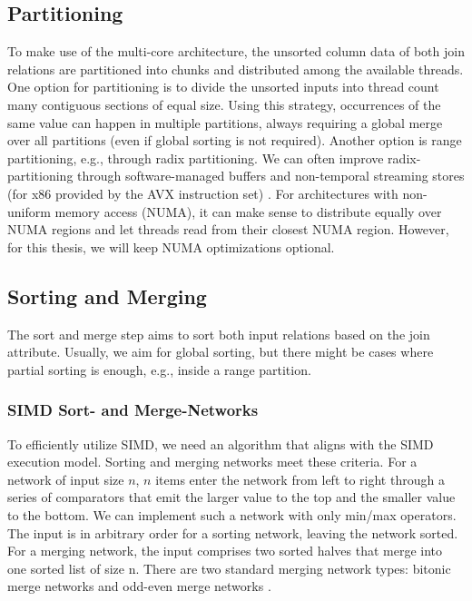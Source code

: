 \subsection{Partitioning}
To make use of the multi-core architecture, the unsorted column data of both join relations are partitioned
into chunks and distributed among the available threads. One option for partitioning is to divide
the unsorted inputs into thread count many contiguous sections of equal size. Using this 
strategy, occurrences of the same value can happen in multiple partitions, always requiring a global
merge over all partitions (even if global sorting is not required). Another option is range partitioning, e.g., through radix partitioning.
We can often improve radix-partitioning through software-managed buffers and non-temporal streaming
stores (for x86 provided by the AVX instruction set) \cite{DBLP:journals/pvldb/SchuhknechtKD15}.
For architectures with non-uniform memory access
(NUMA), it can make sense to distribute equally over NUMA regions and let threads read from their 
closest NUMA region. However, for this thesis, we will keep NUMA optimizations optional.

\subsection{Sorting and Merging}

The sort and merge step aims to sort both input relations based on the join attribute. Usually,
we aim for global sorting, but there might be cases where partial sorting is enough, e.g.,
inside a range partition.

\subsubsection{SIMD Sort- and Merge-Networks}

To efficiently utilize SIMD, we need an algorithm that aligns with the SIMD execution model. 
Sorting and merging networks meet these criteria. 
For a network of input size $n$, $n$ items enter the network from left to right through a series of 
comparators that emit the larger value to the top and the smaller value to the bottom. We can
implement such a network with only min/max operators. The input is in arbitrary order for a 
sorting network, leaving the network sorted. For a merging network, the input comprises two sorted
halves that merge into one sorted list of size n. There are two standard merging network types:
bitonic merge networks and odd-even merge networks \cite{10.14778/1454159.1454171}. 

